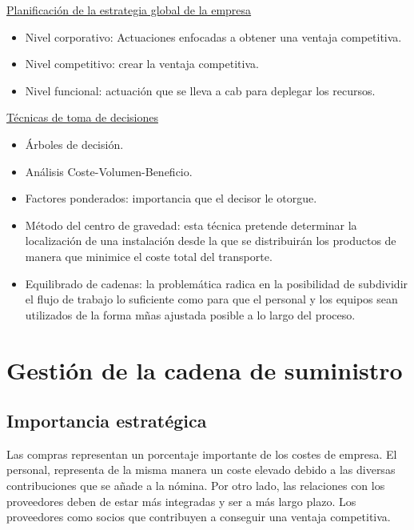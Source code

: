 \documentclass[12pt]{book} %
\providecommand{\tightlist}{%
  \setlength{\itemsep}{0pt}\setlength{\parskip}{0pt}}
\begin{document}
\underline{Planificación de la estrategia global de la empresa}

\begin{itemize}
\tightlist
\item
  Nivel corporativo: Actuaciones enfocadas a obtener una ventaja
  competitiva.
\item
  Nivel competitivo: crear la ventaja competitiva.
\item
  Nivel funcional: actuación que se lleva a cab para deplegar los
  recursos.
\end{itemize}

\underline{Técnicas de toma de decisiones}

\begin{itemize}
\tightlist
\item
  Árboles de decisión.
\item
  Análisis Coste-Volumen-Beneficio.
\item
  Factores ponderados: importancia que el decisor le otorgue.
\item
  Método del centro de gravedad: esta técnica pretende determinar la
  localización de una instalación desde la que se distribuirán los
  productos de manera que minimice el coste total del transporte.
\item
  Equilibrado de cadenas: la problemática radica en la posibilidad de
  subdividir el flujo de trabajo lo suficiente como para que el personal
  y los equipos sean utilizados de la forma mñas ajustada posible a lo
  largo del proceso.
\end{itemize}


\hypertarget{gestiuxf3n-de-la-cadena-de-suministro}{%
\chapter{Gestión de la cadena de
suministro}\label{gestiuxf3n-de-la-cadena-de-suministro}}

\hypertarget{importancia-estratuxe9gica}{%
\section{Importancia estratégica}\label{importancia-estratuxe9gica}}

Las compras representan un porcentaje importante de los costes de
empresa. El personal, representa de la misma manera un coste elevado
debido a las diversas contribuciones que se añade a la nómina. Por otro
lado, las relaciones con los proveedores deben de estar más integradas y
ser a más largo plazo. Los proveedores como socios que contribuyen a
conseguir una ventaja competitiva.
\end{document}
